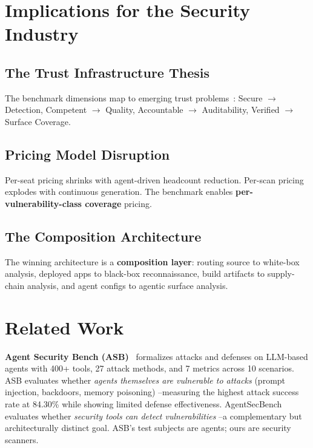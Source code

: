 \documentclass[11pt,twocolumn]{article}
\begin{document}
\section{Implications for the Security Industry}

\subsection{The Trust Infrastructure Thesis}

The benchmark dimensions map to emerging trust problems~\cite{gosavi2026}: Secure $\rightarrow$ Detection, Competent $\rightarrow$ Quality, Accountable $\rightarrow$ Auditability, Verified $\rightarrow$ Surface Coverage.

\subsection{Pricing Model Disruption}

Per-seat pricing shrinks with agent-driven headcount reduction. Per-scan pricing explodes with continuous generation. The benchmark enables \textbf{per-vulnerability-class coverage} pricing.

\subsection{The Composition Architecture}

The winning architecture is a \textbf{composition layer}: routing source to white-box analysis, deployed apps to black-box reconnaissance, build artifacts to supply-chain analysis, and agent configs to agentic surface analysis.

\section{Related Work}

\textbf{Agent Security Bench (ASB)}~\cite{asb2024} formalizes attacks and defenses on LLM-based agents with 400+ tools, 27 attack methods, and 7 metrics across 10 scenarios. ASB evaluates whether \textit{agents themselves are vulnerable to attacks} (prompt injection, backdoors, memory poisoning) --measuring the highest attack success rate at 84.30\% while showing limited defense effectiveness. AgentSecBench evaluates whether \textit{security tools can detect vulnerabilities} --a complementary but architecturally distinct goal. ASB's test subjects are agents; ours are security scanners.
\end{document}
